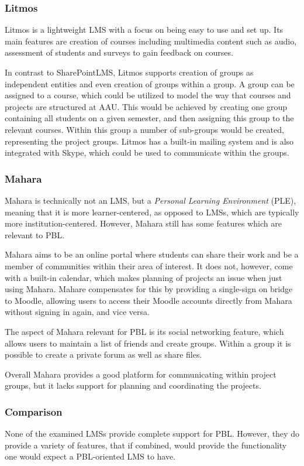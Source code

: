 \subsubsection{Litmos}
Litmos \citep{litmos} is a lightweight LMS with a focus on being easy to use and set up.
Its main features are creation of courses including multimedia content such as audio, assessment of students and surveys to gain feedback on courses.

In contrast to SharePointLMS, Litmos supports creation of groups as independent entities and even creation of groups within a group.
A group can be assigned to a course, which could be utilized to model the way that courses and projects are structured at AAU.
This would be achieved by creating one group containing all students on a given semester, and then assigning this group to the relevant courses.
Within this group a number of sub-groups would be created, representing the project groups.
Litmos has a built-in mailing system and is also integrated with Skype, which could be used to communicate within the groups.

\subsubsection{Mahara}
Mahara \citep{mahara} is technically not an LMS, but a \emph{Personal Learning Environment} (PLE), meaning that it is more learner-centered, as opposed to LMSs, which are typically more institution-centered.
However, Mahara still has some features which are relevant to PBL.

Mahara aims to be an online portal where students can share their work and be a member of communities within their area of interest.
It does not, however, come with a built-in calendar, which makes planning of projects an issue when just using Mahara.
Mahare compensates for this by providing a single-sign on bridge to Moodle, allowing users to access their Moodle accounts directly from Mahara without signing in again, and vice versa.

The aspect of Mahara relevant for PBL is its social networking feature, which allows users to maintain a list of friends and create groups.
Within a group it is possible to create a private forum as well as share files.

Overall Mahara provides a good platform for communicating within project groups, but it lacks support for planning and coordinating the projects.

\subsubsection{Comparison}
None of the examined LMSs provide complete support for PBL.
However, they do provide a variety of features, that if combined, would provide the functionality one would expect a PBL-oriented LMS to have.

